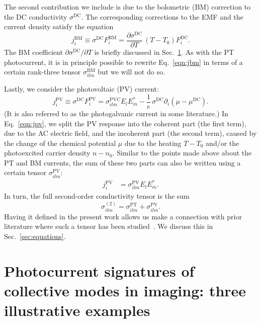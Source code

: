 \documentclass[aps, prb, reprint, superscriptaddress]{revtex4-2}
\begin{document}
The second contribution we include is due to the bolometric (BM) correction to
the DC conductivity $\sigma^\mathrm{DC}$.
The corresponding corrections to the EMF and the current density satisfy the equation
\begin{equation}
	j_i^\mathrm{BM} \equiv \sigma^{\mathrm{DC}}	
	F_i^{\mathrm{BM}} = \frac{\partial \sigma^\mathrm{DC}}{\partial T}\, (T - T_0)
	 F_i^{\mathrm{DC}}. 
	\label{eqn:jbm}
\end{equation}
The BM coefficient ${\partial \sigma^\mathrm{DC}} / {\partial T}$
is briefly discussed in Sec.~\ref{sec:spatial}. 
As with the PT photocurrent, it is in principle possible to rewrite Eq.~\eqref{eqn:jbm} in terms of a certain rank-three tensor $\sigma^\mathrm{BM}_{ilm}$ but we will not do so.

Lastly, we consider the photovoltaic (PV) current:
\begin{equation}
	j_i^\mathrm{PV} \equiv \sigma^{\mathrm{DC}}	
	F_i^{\mathrm{PV}} = \sigma_{ilm}^\mathrm{PVC} E_l E^*_m  - \frac{1}{e}\,
	\sigma^{\mathrm{DC}} \partial_i\left(\mu - \mu^{\mathrm{DC}}\right). 
	\label{eqn:jpv}
\end{equation}
(It is also referred to as the photogalvanic current in some literature.)
In Eq.~\eqref{eqn:jpv}, we split the PV response into the coherent part (the first term), due to the AC electric field, and the incoherent part (the second term), caused by the change of the chemical potential $\mu$ due to the heating $T - T_0$ and/or the photoexcited carrier density $n - n_0$.
Similar to the points made above about the PT and BM currents,
the sum of these two parts can also be written using a certain tensor $\sigma^\mathrm{PV}_{ilm}$:
\begin{align}
	j_i^\mathrm{PV} &= \sigma^\mathrm{PV}_{ilm} E_{l} E^*_{m}.
	\label{eqn:jPV_sigmaPV}
\end{align}
In turn, the full second-order conductivity tensor is the sum
\begin{equation}
	\sigma^{(2)}_{ilm} =  \sigma^\mathrm{PT}_{ilm} + \sigma^\mathrm{PV}_{ilm}.
	\label{eqn:sigma2split}
\end{equation}
Having it defined in the present work allows us make a connection with prior literature where
such a tensor has been studied~\cite{Sun2018}.
We discuss this in Sec.~\ref{sec:equations}.

\section{Photocurrent signatures of collective modes in imaging: three illustrative examples}
\label{sec:spatial}
\end{document}

